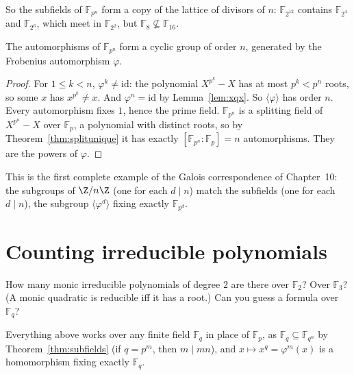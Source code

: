 So the subfields of $\mathbb F_{p^n}$ form a copy of the lattice of divisors of $n$: $\mathbb F_{2^{12}}$ contains $\mathbb F_{2^4}$ and $\mathbb F_{2^6}$, which meet in $\mathbb F_{2^2}$, but $\mathbb F_8\not\subseteq\mathbb F_{16}$.

\begin{theorem}\label{thm:galfq}
The automorphisms of $\mathbb F_{p^n}$ form a cyclic group of order $n$, generated by the Frobenius automorphism $\varphi$.
\end{theorem}
\begin{proof}
For $1\le k<n$, $\varphi^k\ne\mathrm{id}$: the polynomial $X^{p^k}-X$ has at most $p^k<p^n$ roots, so some $x$ has $x^{p^k}\ne x$. And $\varphi^n=\mathrm{id}$ by Lemma~\ref{lem:xqx}. So $\langle\varphi\rangle$ has order $n$. Every automorphism fixes $1$, hence the prime field. $\mathbb F_{p^n}$ is a splitting field of $X^{p^n}-X$ over $\mathbb F_p$, a polynomial with distinct roots, so by Theorem~\ref{thm:splitunique} it has exactly $[\mathbb F_{p^n}:\mathbb F_p]=n$ automorphisms. They are the powers of $\varphi$.
\end{proof}

This is the first complete example of the Galois correspondence of Chapter~10: the subgroups of $\Z/n\Z$ (one for each $d\mid n$) match the subfields (one for each $d\mid n$), the subgroup $\langle\varphi^d\rangle$ fixing exactly $\mathbb F_{p^d}$.

\section{Counting irreducible polynomials}

\begin{think}
How many monic irreducible polynomials of degree $2$ are there over $\mathbb F_2$? Over $\mathbb F_3$? (A monic quadratic is reducible iff it has a root.) Can you guess a formula over $\mathbb F_q$?
\end{think}

Everything above works over any finite field $\mathbb F_q$ in place of $\mathbb F_p$, as $\mathbb F_q\subseteq\mathbb F_{q^n}$ by Theorem~\ref{thm:subfields} (if $q=p^m$, then $m\mid mn$), and $x\mapsto x^q=\varphi^m(x)$ is a homomorphism fixing exactly $\mathbb F_q$.

